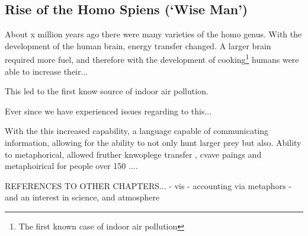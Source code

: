 \subsection{Rise of the Homo Spiens (`Wise Man')}
About x million years ago there were many varieties of the homo genus. With the development of the human brain, energy transfer changed. A larger brain required more fuel, and therefore with the development of cooking\footnote{The first known case of indoor air pollution} humans were able to increase their...

This led to the first know source of indoor air pollution.

Ever since we have experienced issues regarding to this... 






With the this increased capability, a language capable of communicating information, allowing for the ability to not only hunt larger prey but also.
Ability to metaphorical, allowed fruther knwoplege transfer , cvave paings and metaphoirical for people over 150 ....

REFERENCES TO OTHER CHAPTERS...
- vis
- accounting via metaphors
- and an interest in science, and atmosphere

